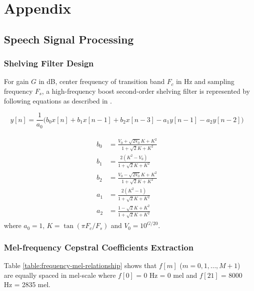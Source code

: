 \appendix
\chapter{Appendix}


\section{Speech Signal Processing}

\subsection{Shelving Filter Design}
\label{shelving-appendix}
For gain $G$ in dB, center frequency of transition band $F_c$ in Hz and sampling frequency $F_s$, a high-frequency boost second-order shelving filter is represented by following equations as described in \cite{DAFX_book}.

\begin{equation}
y[n] = \frac{1}{a_0} \Big( b_0 x[n] + b_1 x[n-1] + b_2 x[n-3] - a_1 y[n-1] - a_2 y[n-2] \Big)
\end{equation}

\begin{align}
\begin{split}
b_0 &= \frac{V_0 + \sqrt{2V_0} K + K^2}{1 + \sqrt{2} K + K^2}\\
b_1 &= \frac{2 (K^2 - V_0)}{1 + \sqrt{2} K + K^2}\\
b_2 &= \frac{V_0 - \sqrt{2V_0} K + K^2}{1 + \sqrt{2} K + K^2}\\
a_1 &= \frac{2 (K^2 - 1)}{1 + \sqrt{2} K + K^2}\\
a_2 &= \frac{1 - \sqrt{2}K + K^2}{1 + \sqrt{2}K + K^2}
\end{split}
\end{align}
where $a_0 = 1$, $K = \tan(\pi F_c / F_s)$ and $V_0 = 10^{G/20}$.


\subsection{Mel-frequency Cepstral Coefficients Extraction}

Table \ref{table:frequency-mel-relationship} shows that $f[m]$ ($m = 0, 1, \dots, M+1$) are equally spaced in mel-scale where $f[0]$ = 0 Hz = 0 mel and $f[21]$ = 8000 Hz = 2835 mel.


